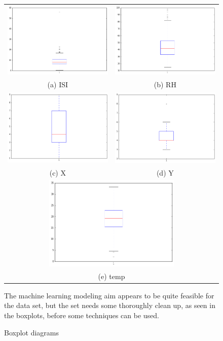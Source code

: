 \begin{figure}
\begin{tabular}{cc}
 \includegraphics[width=65mm]{images/boxplots/ISI.png} &   \includegraphics[width=65mm]{images/boxplots/RH.png} \\
(a) ISI & (b) RH \\[6pt]
  \includegraphics[width=65mm]{images/boxplots/x.png} &   \includegraphics[width=65mm]{images/boxplots/y.png} \\
(c) X & (d) Y \\[6pt]
\multicolumn{2}{c}{\includegraphics[width=65mm]{images/boxplots/temp.png} }\\
\multicolumn{2}{c}{(e) temp}
\end{tabular}
\caption{Boxplot diagrams}

The machine learning modeling aim appears to be quite feasible for the data set, but the set needs some thoroughly clean up, as seen in the boxplots, before some techniques can be used. 


\end{figure}